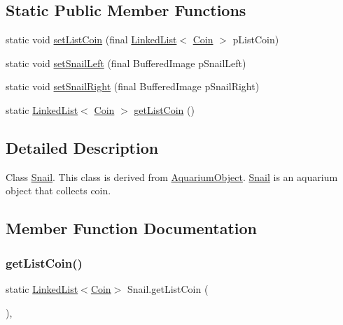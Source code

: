 \subsection*{Static Public Member Functions}
\begin{DoxyCompactItemize}
\item 
static void \mbox{\hyperlink{class_snail_a0c21e4603e41e352e2d3d91d172e0b9e}{set\+List\+Coin}} (final \mbox{\hyperlink{class_linked_list}{Linked\+List}}$<$ \mbox{\hyperlink{class_coin}{Coin}} $>$ p\+List\+Coin)
\item 
static void \mbox{\hyperlink{class_snail_a90cd994cbdd5daae66bade7702472dac}{set\+Snail\+Left}} (final Buffered\+Image p\+Snail\+Left)
\item 
static void \mbox{\hyperlink{class_snail_a604a57abe628e6f708d61365630fdc9e}{set\+Snail\+Right}} (final Buffered\+Image p\+Snail\+Right)
\item 
static \mbox{\hyperlink{class_linked_list}{Linked\+List}}$<$ \mbox{\hyperlink{class_coin}{Coin}} $>$ \mbox{\hyperlink{class_snail_ae777445d6e995a27c4049fbf9a51c7a5}{get\+List\+Coin}} ()
\end{DoxyCompactItemize}


\subsection{Detailed Description}
Class \mbox{\hyperlink{class_snail}{Snail}}. This class is derived from \mbox{\hyperlink{class_aquarium_object}{Aquarium\+Object}}. \mbox{\hyperlink{class_snail}{Snail}} is an aquarium object that collects coin. 

\subsection{Member Function Documentation}
\mbox{\label{class_snail_ae777445d6e995a27c4049fbf9a51c7a5}} 
\subsubsection{\texorpdfstring{get\+List\+Coin()}{getListCoin()}}
{\footnotesize\ttfamily static \mbox{\hyperlink{class_linked_list}{Linked\+List}}$<$\mbox{\hyperlink{class_coin}{Coin}}$>$ Snail.\+get\+List\+Coin (\begin{DoxyParamCaption}{ }\end{DoxyParamCaption})\hspace{0.3cm}{\ttfamily [inline]}, {\ttfamily [static]}}

